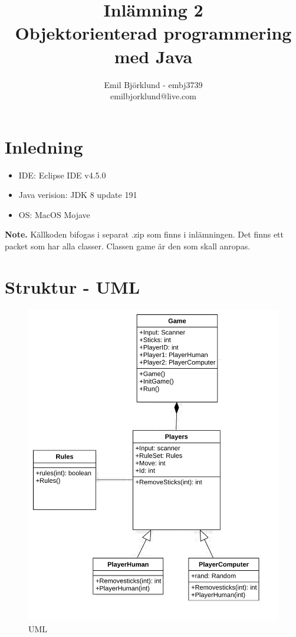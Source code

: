 \documentclass[hidelinks]{article}
\title{Inlämning 2 \\ Objektorienterad programmering med Java}
\author{Emil Björklund - embj3739 \\ emilbjorklund@live.com}
\begin{document}
\maketitle 
\newpage

\section*{Inledning}
\begin {itemize}
\item IDE: Eclipse IDE v4.5.0
\item Java verision: JDK 8 update 191
\item OS: MacOS Mojave
\end{itemize}

\textbf{Note.} Källkoden bifogas i separat .zip som finns i inlämningen. Det finns ett packet som har alla classer. Classen game är den som skall anropas.

\section*{Struktur - UML}
\begin{figure}[H]
\centering
\includegraphics[scale=0.30]{pic}
\caption{UML}
\end{figure}
\newpage
\end{document}
